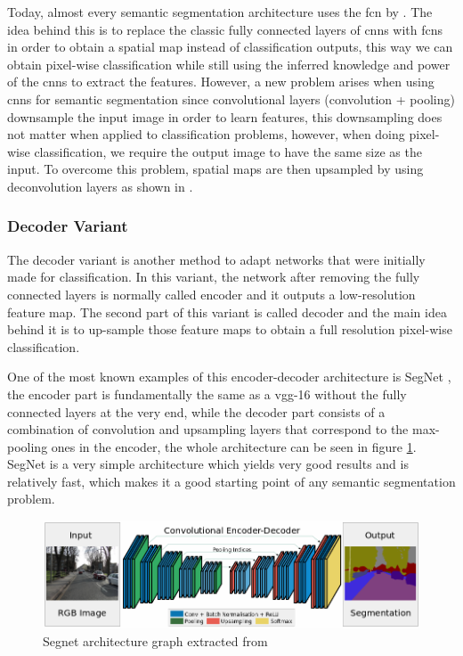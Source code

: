 Today, almost every semantic segmentation architecture uses the \gls{fcn} by \cite{DBLP:journals/corr/LongSD14}. The idea behind this is to replace the classic fully connected layers of \gls{cnn}s with \gls{fcn}s in order to obtain a spatial map instead of classification outputs, this way we can obtain pixel-wise classification while still using the inferred knowledge and power of the \gls{cnn}s to extract the features. However, a new problem arises when using \gls{cnn}s for semantic segmentation since  convolutional layers (convolution + pooling) downsample the input image in order to learn features, this downsampling does not matter when applied to classification problems, however, when doing pixel-wise classification, we require the output image to have the same size as the input. To overcome this problem, spatial maps are then upsampled by using deconvolution layers as shown in \cite{deconvolution}.

\subsubsection{Decoder Variant}
The decoder variant is another method to adapt networks that were initially made for classification. In this variant, the network after removing the fully connected layers is normally called encoder and it outputs a low-resolution feature map. The second part of this variant is called decoder and the main idea behind it is to up-sample those feature maps to obtain a full resolution pixel-wise classification.

One of the most known examples of this encoder-decoder architecture is SegNet \cite{DBLP:journals/corr/BadrinarayananK15}, the encoder part is fundamentally the same as a \gls{vgg}-16 without the fully connected layers at the very end, while the decoder part consists of a combination of convolution and upsampling layers that correspond to the max-pooling ones in the encoder, the whole architecture can be seen in figure \ref{fig:segnet}. SegNet is a very simple architecture which yields very good results and is relatively fast, which makes it a good starting point of any semantic segmentation problem.

\begin{figure}[h]
	\includegraphics[scale=0.5]{archivos/segnet.png}
	\centering
	\caption{Segnet architecture graph extracted from \cite{DBLP:journals/corr/BadrinarayananK15}}
	\label{fig:segnet}
\end{figure}

